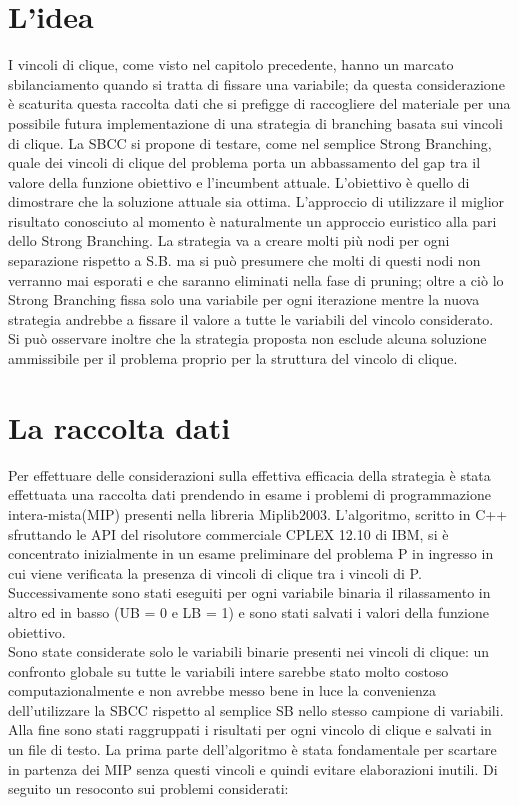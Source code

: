 \documentclass[12pt,a4paper,twoside,openright]{book}
\begin{document}
\section{L'idea}
I vincoli di clique, come visto nel capitolo precedente, hanno un marcato sbilanciamento quando si 
tratta di fissare una variabile; da questa considerazione è scaturita questa raccolta dati  
che si prefigge di raccogliere del materiale per una possibile futura implementazione di una 
strategia di branching basata sui vincoli di clique. La SBCC si propone di testare, come nel semplice Strong Branching,
quale dei vincoli di clique del problema porta un abbassamento del gap tra il valore della funzione obiettivo e
l'incumbent attuale. L'obiettivo è quello di dimostrare che la soluzione attuale sia ottima.
L'approccio di utilizzare il miglior risultato conosciuto al momento è naturalmente un approccio
euristico alla pari dello Strong Branching.
La strategia va a creare molti più nodi per ogni separazione rispetto a S.B. ma si può presumere che 
molti di questi nodi non verranno mai esporati e che saranno eliminati nella fase di pruning; oltre a ciò
lo Strong Branching fissa solo una variabile per ogni iterazione mentre la nuova strategia andrebbe a fissare 
il valore a tutte le variabili del vincolo considerato. \\
Si può osservare inoltre che la strategia proposta non esclude alcuna soluzione ammissibile per il
problema proprio per la struttura del vincolo di clique.

\section{La raccolta dati}
Per effettuare delle considerazioni sulla effettiva efficacia della strategia è stata effettuata 
una raccolta dati prendendo in esame i problemi di programmazione intera-mista(MIP) presenti
nella libreria Miplib2003. L’algoritmo, scritto in C++ sfruttando le API del risolutore 
commerciale CPLEX 12.10 di IBM, si è concentrato inizialmente in un esame preliminare del 
problema P in ingresso in cui viene verificata la presenza di vincoli di clique tra i vincoli di P. 
Successivamente sono stati eseguiti per ogni variabile binaria il rilassamento in altro ed in basso 
(UB  = 0 e LB = 1) e sono stati salvati i valori della funzione obiettivo. \\
Sono state considerate solo le variabili binarie presenti nei vincoli di clique: un confronto globale
su tutte le variabili intere sarebbe stato molto costoso computazionalmente e non avrebbe messo bene 
in luce la convenienza dell'utilizzare la SBCC rispetto al semplice SB nello stesso campione di variabili.\\
Alla fine sono stati raggruppati i risultati per ogni vincolo di clique e salvati in un file di testo. 
La prima parte dell’algoritmo è stata fondamentale per scartare in partenza dei MIP senza 
questi vincoli e quindi evitare elaborazioni inutili.
\clearpage
\pagebreak 
Di seguito un resoconto sui problemi considerati:
\end{document}
